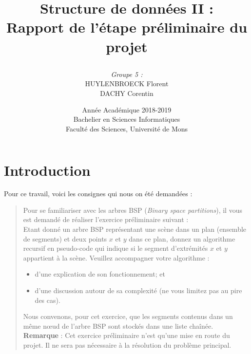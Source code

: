 \documentclass[10pt]{article}
\begin{document}
\begin{titlepage}
\title{\Huge \textbf{Structure de données II :\\
Rapport de l'étape préliminaire du projet}\\
\smallskip
\author{\emph{Groupe 5 :} \\
HUYLENBROECK Florent\\
DACHY Corentin\\}
}
\date{Année Académique 2018-2019\\
Bachelier en Sciences Informatiques\\
\vspace{1cm}
Faculté des Sciences, Université de Mons}
\maketitle
\end{titlepage}

\tableofcontents

\newpage
\section{Introduction}
Pour ce travail, voici les consignes qui nous on été demandées :\\
\begin{quote}
Pour se familiariser avec les arbres BSP (\emph{Binary space partitions}), il vous est demandé de réaliser l’exercice préliminaire suivant :\\[.5cm]
Etant donné un arbre BSP représentant une scène dans un plan (ensemble de segments) et deux points $x$ et $y$ dans ce plan, donnez un algorithme recursif en pseudo-code qui indique si le segment d’extrémités $x$ et $y$ appartient à la scène.  Veuillez accompagner votre algorithme :
\begin{itemize}
\item d’une explication de son fonctionnement; et
\item d’une discussion autour de sa complexité (ne vous limitez pas au pire des cas).
\end{itemize}
Nous convenons,  pour cet exercice,  que les segments contenus dans un même nœud de l’arbre BSP
sont stockés dans une liste chaînée.\\[.5cm]
\textbf{Remarque} : Cet exercice préliminaire n’est qu’une mise en route du projet.  Il ne sera pas nécessaire à la résolution du problème principal.
\end{quote}
\end{document}
